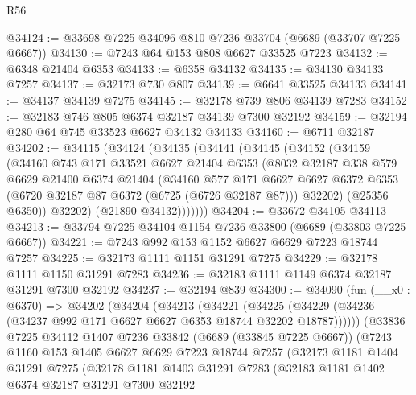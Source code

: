 \begin{lexlean}{R56}
\begin{coremodule}
@34124 := @33698 @7225 @34096 @810 @7236 @33704 (@6689 (@33707 @7225 @6667))
@34130 := @7243 @64 @153 @808 @6627 @33525 @7223
@34132 := @6348 @21404 @6353
@34133 := @6358 @34132
@34135 := @34130 @34133 @7257
@34137 := @32173 @730 @807
@34139 := @6641 @33525 @34133
@34141 := @34137 @34139 @7275
@34145 := @32178 @739 @806 @34139 @7283
@34152 := @32183 @746 @805 @6374 @32187 @34139 @7300 @32192
@34159 := @32194 @280 @64 @745 @33523 @6627 @34132 @34133
@34160 := @6711 @32187
@34202 := @34115
    (@34124
      (@34135
        (@34141
          (@34145
            (@34152
              (@34159
                (@34160
                  @743
                  @171
                  @33521
                  @6627
                  @21404
                  @6353
                  (@8032
                    @32187
                    @338
                    @579
                    @6629
                    @21400
                    @6374
                    @21404
                    (@34160
                      @577
                      @171
                      @6627
                      @6627
                      @6372
                      @6353
                      (@6720 @32187 @87 @6372 (@6725 (@6726 @32187 @87)))
                      @32202)
                    (@25356 @6350))
                  @32202)
                (@21890 @34132)))))))
@34204 := @33672 @34105 @34113
@34213 := @33794 @7225 @34104 @1154 @7236 @33800 (@6689 (@33803 @7225 @6667))
@34221 := @7243 @992 @153 @1152 @6627 @6629 @7223 @18744 @7257
@34225 := @32173 @1111 @1151 @31291 @7275
@34229 := @32178 @1111 @1150 @31291 @7283
@34236 := @32183 @1111 @1149 @6374 @32187 @31291 @7300 @32192
@34237 := @32194 @839
@34300 := @34090
    (fun (__x0 : @6370) =>
    @34202
      (@34204
        (@34213
          (@34221
            (@34225 (@34229 (@34236 (@34237 @992 @171 @6627 @6627 @6353 @18744 @32202 @18787))))))
        (@33836
          @7225
          @34112
          @1407
          @7236
          @33842
          (@6689 (@33845 @7225 @6667))
          (@7243
            @1160
            @153
            @1405
            @6627
            @6629
            @7223
            @18744
            @7257
            (@32173
              @1181
              @1404
              @31291
              @7275
              (@32178
                @1181
                @1403
                @31291
                @7283
                (@32183
                  @1181
                  @1402
                  @6374
                  @32187
                  @31291
                  @7300
                  @32192

\end{coremodule}
\end{lexlean}
